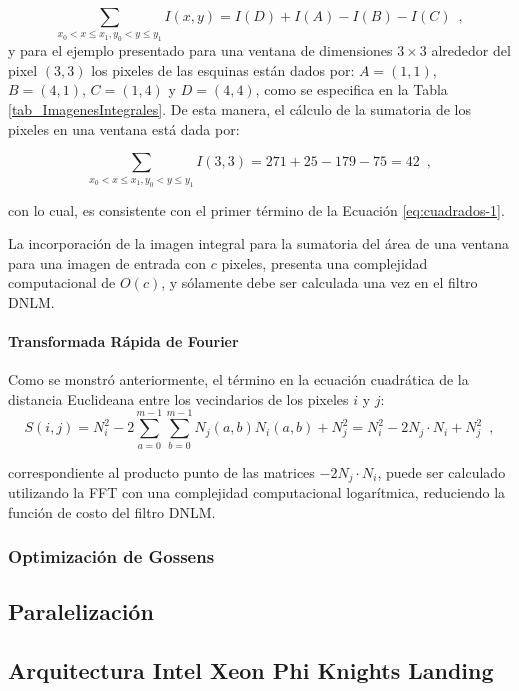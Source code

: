 \begin{equation}
\sum_{x_{0}<x\leq x_{1},y_{0}<y\leq y_{1}}I\left(x,y\right)=I\left(D\right)+I\left(A\right)-I\left(B\right)-I\left(C\right) \enspace ,
\end{equation}
y para el ejemplo presentado para una ventana de dimensiones $3\times3$ alrededor del pixel $(3,3)$ los pixeles de las esquinas est\'an dados por: $A=\left(1,1\right)$, $B=\left(4,1\right)$,
$C=\left(1,4\right)$ y $D=\left(4,4\right)$, como se especifica en la Tabla \ref{tab_ImagenesIntegrales}. De esta manera, el c\'alculo de la sumatoria de los pixeles en una ventana est\'a dada por: 

\begin{equation}
\sum_{x_{0}<x\leq x_{1},y_{0}<y\leq y_{1}}I\left(3,3\right)=271+25-179-75=42 \enspace ,
\end{equation}

con lo cual, es consistente con el primer t\'ermino de la Ecuaci\'on \ref{eq:cuadrados-1}. 

La incorporaci\'on de la imagen integral para la sumatoria del \'area de una ventana para una imagen de entrada con $c$ pixeles, presenta una complejidad computacional de $O(c)$, y s\'olamente debe ser calculada una vez en el filtro DNLM.


\paragraph{Transformada R\'apida de Fourier}

Como se monstr\'o anteriormente, el t\'ermino en la ecuaci\'on cuadr\'atica de la distancia Euclideana entre los vecindarios de los pixeles $i$ y $j$:
\begin{equation}
S\left(i,j\right)=N_{i}^{2}-2\sum_{a=0}^{m-1}\sum_{b=0}^{m-1}N_{j}\left(a,b\right)N_{i}\left(a,b\right)+N_{j}^{2} =N_{i}^{2}-2N_{j}\cdot N_{i}+N_{j}^{2} \enspace , 
\end{equation}



correspondiente al producto punto de las matrices $-2N_{j}\cdot N_{i}$,  puede ser calculado utilizando la FFT con una complejidad computacional logar\'itmica, reduciendo la funci\'on de costo del filtro DNLM. 



\subsubsection{Optimizaci\'on de Gossens}


\subsection{Paralelizaci\'on}

\subsection{Arquitectura Intel Xeon Phi Knights Landing}